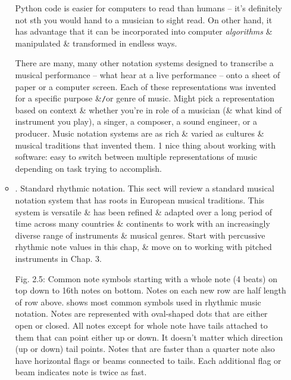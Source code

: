 \documentclass{article}
\begin{document}
\begin{itemize}
\begin{itemize}
		Python code is easier for computers to read than humans -- it's definitely not sth you would hand to a musician to sight read. On other hand, it has advantage that it can be incorporated into computer {\it algorithms} \& manipulated \& transformed in endless ways.
		
		There are many, many other notation systems designed to transcribe a musical performance -- what hear at a live performance -- onto a sheet of paper or a computer screen. Each of these representations was invented for a specific purpose \&{\tt/}or genre of music. Might pick a representation based on context \& whether you're in role of a musician (\& what kind of instrument you play), a singer, a composer, a sound engineer, or a producer. Music notation systems are as rich \& varied as cultures \& musical traditions that invented them. 1 nice thing about working with software: easy to switch between multiple representations of music depending on task trying to accomplish.
		\item {. Standard rhythmic notation.} This sect will review a standard musical notation system that has roots in European musical traditions. This system is versatile \& has been refined \& adapted over a long period of time across many countries \& continents to work with an increasingly diverse range of instruments \& musical genres. Start with percussive rhythmic note values in this chap, \& move on to working with pitched instruments in Chap. 3.
		
		{\sf Fig. 2.5: Common note symbols starting with a whole note (4 beats) on top down to 16th notes on bottom. Notes on each new row are half length of row above.} shows most common symbols used in rhythmic music notation. Notes are represented with oval-shaped dots that are either open or closed. All notes except for whole note have tails attached to them that can point either up or down. It doesn't matter which direction (up or down) tail points. Notes that are faster than a quarter note also have horizontal flags or beams connected to tails. Each additional flag or beam indicates note is twice as fast.
		

\end{itemize}
\end{itemize}
\end{document}
